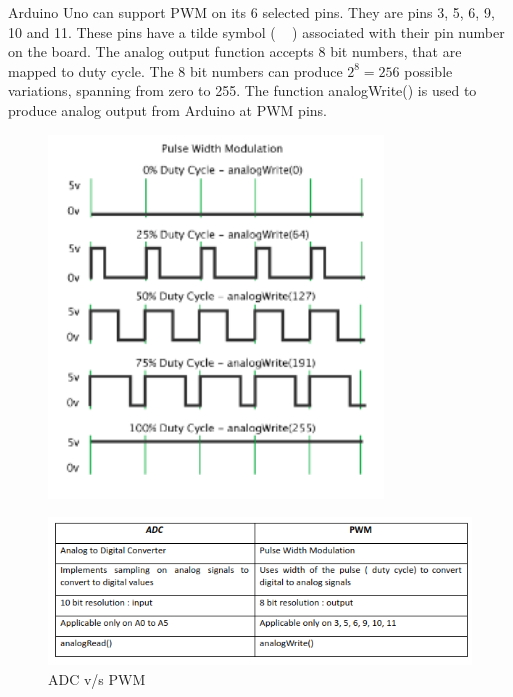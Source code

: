 Arduino Uno can support PWM on its 6 selected pins. They are pins 3, 5, 6, 9, 10 and 11. These pins have a tilde symbol ( ~ ) associated with their pin number on the board. The analog output function accepts 8 bit numbers, that are mapped to duty cycle. The 8 bit numbers can produce $2^8=256$ possible variations, spanning from zero to 255. The function analogWrite() is used to  produce analog output from Arduino at PWM pins.\\
\begin{figure}
 \centering
 \includegraphics[width=3.5in]{Chapters/images/pwm.png}
\end{figure}
\begin{figure}
 \centering
 \includegraphics[width=6.5in]{Chapters/images/ardtab1.png}
 \caption{ADC v/s PWM}
\end{figure}









